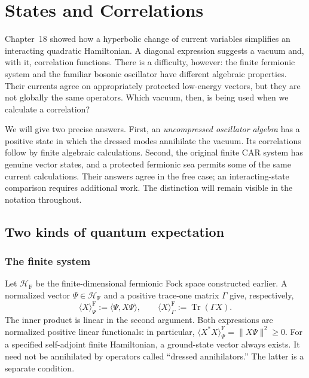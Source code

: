 \chapter{States and Correlations}
\label{ch:correlations}

Chapter~18 showed how a hyperbolic change of current variables simplifies
an interacting quadratic Hamiltonian.  A diagonal expression suggests a
vacuum and, with it, correlation functions.  There is a difficulty, however:
the finite fermionic system and the familiar bosonic oscillator have
different algebraic properties.  Their currents agree on appropriately
protected low-energy vectors, but they are not globally the same operators.
Which vacuum, then, is being used when we calculate a correlation?

We will give two precise answers.  First, an \emph{uncompressed oscillator
algebra} has a positive state in which the dressed modes annihilate the
vacuum.  Its correlations follow by finite algebraic calculations.  Second,
the original finite CAR system has genuine vector states, and a protected
fermionic sea permits some of the same current calculations.  Their answers
agree in the free case; an interacting-state comparison requires additional
work.  The distinction will remain visible in the notation throughout.

\section{Two kinds of quantum expectation}
\label{sec:ch19-scope}

\subsection*{The finite system}

Let $\mathcal H_{\mathrm F}$ be the finite-dimensional fermionic Fock space
constructed earlier.  A normalized vector $\Psi\in\mathcal H_{\mathrm F}$
and a positive trace-one matrix $\Gamma$ give, respectively,
\begin{equation}
 \langle X\rangle^{\mathrm F}_{\Psi}
 :=\langle\Psi,X\Psi\rangle,
 \qquad
 \langle X\rangle^{\mathrm F}_{\Gamma}
 :=\operatorname{Tr}(\Gamma X).
 \label{eq:ch19-vector-expectation}
\end{equation}
The inner product is linear in the second argument.  Both expressions are
normalized positive linear functionals: in particular,
$\langle X^*X\rangle^{\mathrm F}_{\Psi}=\|X\Psi\|^2\geq0$.
For a specified self-adjoint finite Hamiltonian, a ground-state vector
always exists.  It need not be annihilated by operators called
``dressed annihilators.''  The latter is a separate condition.

